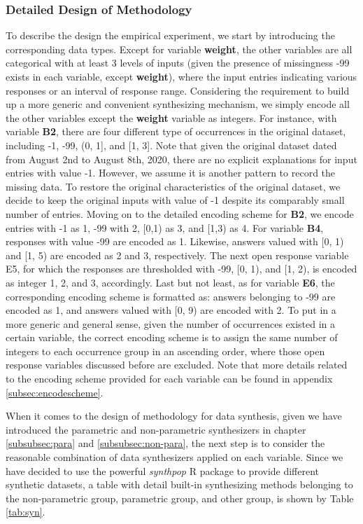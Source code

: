\subsubsection{Detailed Design of Methodology}
\label{subsubsec:design}
To describe the design the empirical experiment, we start by introducing the corresponding data types. Except for variable \textbf{weight}, the other variables are all categorical with at least 3 levels of inputs (given the presence of missingness -99 exists in each variable, except \textbf{weight}), where the input entries indicating various responses or an interval of response range. Considering the requirement to build up a more generic and convenient synthesizing mechanism, we simply encode all the other variables except the \textbf{weight} variable as integers. For instance, with variable \textbf{B2}, there are four different type of occurrences in the original dataset, including -1, -99, (0, 1], and [1, 3]. Note that given the original dataset dated from August 2nd to August 8th, 2020, there are no explicit explanations for input entries with value -1. However, we assume it is another pattern to record the missing data. To restore the original characteristics of the original dataset, we decide to keep the original inputs with value of -1 despite its comparably small number of entries. Moving on to the detailed encoding scheme for \textbf{B2}, we encode entries with -1 as 1, -99 with 2, [0,1) as 3, and [1,3) as 4. For variable \textbf{B4}, responses with value -99 are encoded as 1. Likewise, answers valued with [0, 1) and [1, 5) are encoded as 2 and 3, respectively. The next open response variable E5, for which the responses are thresholded with -99, [0, 1), and [1, 2), is encoded as integer 1, 2, and 3, accordingly. Last but not least, as for variable \textbf{E6}, the corresponding encoding scheme is formatted as: answers belonging to -99 are encoded as 1, and answers valued with [0, 9) are encoded with 2. To put in a more generic and general sense, given the number of occurrences existed in a certain variable, the correct encoding scheme is to assign the same number of integers to each occurrence group in an ascending order, where those open response variables discussed before are excluded. Note that more details related to the encoding scheme provided for each variable can be found in appendix \ref{subsec:encodescheme}.

When it comes to the design of methodology for data synthesis, given we have introduced the parametric and non-parametric synthesizers in chapter \ref{subsubsec:para} and \ref{subsubsec:non-para}, the next step is to consider the reasonable combination of data synthesizers applied on each variable. Since we have decided to use the powerful \textit{synthpop} R package to provide different synthetic datasets, a table with detail built-in synthesizing methods belonging to the non-parametric group, parametric group, and other group, is shown by Table \ref{tab:syn}.

